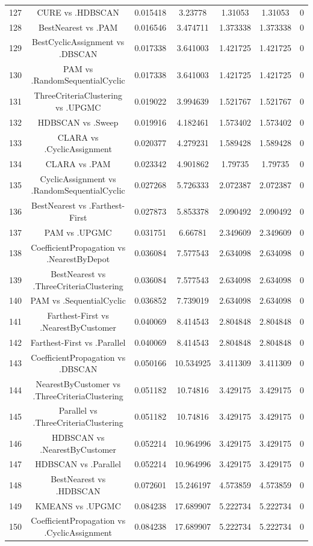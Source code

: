 \documentclass[a4paper,10pt]{article}
\begin{document}
\begin{landscape}
\begin{table}[!htp]
\begin{tabular}{ccccccc}
127&CURE vs .HDBSCAN&0.015418&3.23778&1.31053&1.31053&0\\
128&BestNearest vs .PAM&0.016546&3.474711&1.373338&1.373338&0\\
129&BestCyclicAssignment vs .DBSCAN&0.017338&3.641003&1.421725&1.421725&0\\
130&PAM vs .RandomSequentialCyclic&0.017338&3.641003&1.421725&1.421725&0\\
131&ThreeCriteriaClustering vs .UPGMC&0.019022&3.994639&1.521767&1.521767&0\\
132&HDBSCAN vs .Sweep&0.019916&4.182461&1.573402&1.573402&0\\
133&CLARA vs .CyclicAssignment&0.020377&4.279231&1.589428&1.589428&0\\
134&CLARA vs .PAM&0.023342&4.901862&1.79735&1.79735&0\\
135&CyclicAssignment vs .RandomSequentialCyclic&0.027268&5.726333&2.072387&2.072387&0\\
136&BestNearest vs .Farthest-First&0.027873&5.853378&2.090492&2.090492&0\\
137&PAM vs .UPGMC&0.031751&6.66781&2.349609&2.349609&0\\
138&CoefficientPropagation vs .NearestByDepot&0.036084&7.577543&2.634098&2.634098&0\\
139&BestNearest vs .ThreeCriteriaClustering&0.036084&7.577543&2.634098&2.634098&0\\
140&PAM vs .SequentialCyclic&0.036852&7.739019&2.634098&2.634098&0\\
141&Farthest-First vs .NearestByCustomer&0.040069&8.414543&2.804848&2.804848&0\\
142&Farthest-First vs .Parallel&0.040069&8.414543&2.804848&2.804848&0\\
143&CoefficientPropagation vs .DBSCAN&0.050166&10.534925&3.411309&3.411309&0\\
144&NearestByCustomer vs .ThreeCriteriaClustering&0.051182&10.74816&3.429175&3.429175&0\\
145&Parallel vs .ThreeCriteriaClustering&0.051182&10.74816&3.429175&3.429175&0\\
146&HDBSCAN vs .NearestByCustomer&0.052214&10.964996&3.429175&3.429175&0\\
147&HDBSCAN vs .Parallel&0.052214&10.964996&3.429175&3.429175&0\\
148&BestNearest vs .HDBSCAN&0.072601&15.246197&4.573859&4.573859&0\\
149&KMEANS vs .UPGMC&0.084238&17.689907&5.222734&5.222734&0\\
150&CoefficientPropagation vs .CyclicAssignment&0.084238&17.689907&5.222734&5.222734&0\\

\end{tabular}
\end{table}
\end{landscape}
\end{document}
